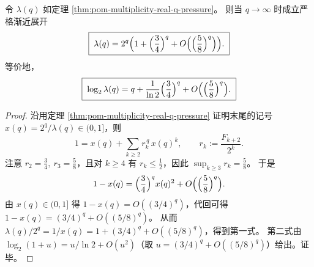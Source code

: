 \begin{proposition}\label{prop:pom-multiplicity-lambdaq-large-q-asymptotic}
令 \(\lambda(q)\) 如定理 \ref{thm:pom-multiplicity-real-q-pressure}。
则当 \(q\to\infty\) 时成立严格渐近展开
\[
\boxed{\;
\lambda(q)=2^{q}\Bigl(1+\Bigl(\frac34\Bigr)^{q}+O\Bigl(\Bigl(\frac58\Bigr)^{q}\Bigr)\Bigr).\;}
\]
等价地，
\[
\boxed{\;
\log_2\lambda(q)=q+\frac{1}{\ln 2}\Bigl(\frac34\Bigr)^{q}+O\Bigl(\Bigl(\frac58\Bigr)^{q}\Bigr).\;}
\]
\end{proposition}
\begin{proof}
沿用定理 \ref{thm:pom-multiplicity-real-q-pressure} 证明末尾的记号 \(x(q)=2^q/\lambda(q)\in(0,1]\)，则
\[
1=x(q)+\sum_{k\ge 2}r_k^{\,q}\,x(q)^k,\qquad
r_k:=\frac{F_{k+2}}{2^k}.
\]
注意
\(
r_2=\frac34,\ r_3=\frac58
\)，且对 \(k\ge 4\) 有 \(r_k\le \frac12\)，因此 \(\sup_{k\ge 3}r_k=\frac58\)。
于是
\[
1-x(q)=\Bigl(\frac34\Bigr)^{q}x(q)^2+O\Bigl(\Bigl(\frac58\Bigr)^{q}\Bigr).
\]
由 \(x(q)\in(0,1]\) 得 \(1-x(q)=O((3/4)^q)\)，代回可得
\(
1-x(q)=(3/4)^q+O((5/8)^q)
\)。
从而
\(
\lambda(q)/2^q=1/x(q)=1+(3/4)^q+O((5/8)^q)
\)，得到第一式。
第二式由 \(\log_2(1+u)=u/\ln 2+O(u^2)\)（取 \(u=(3/4)^q+O((5/8)^q)\)）给出。证毕。
\end{proof}

